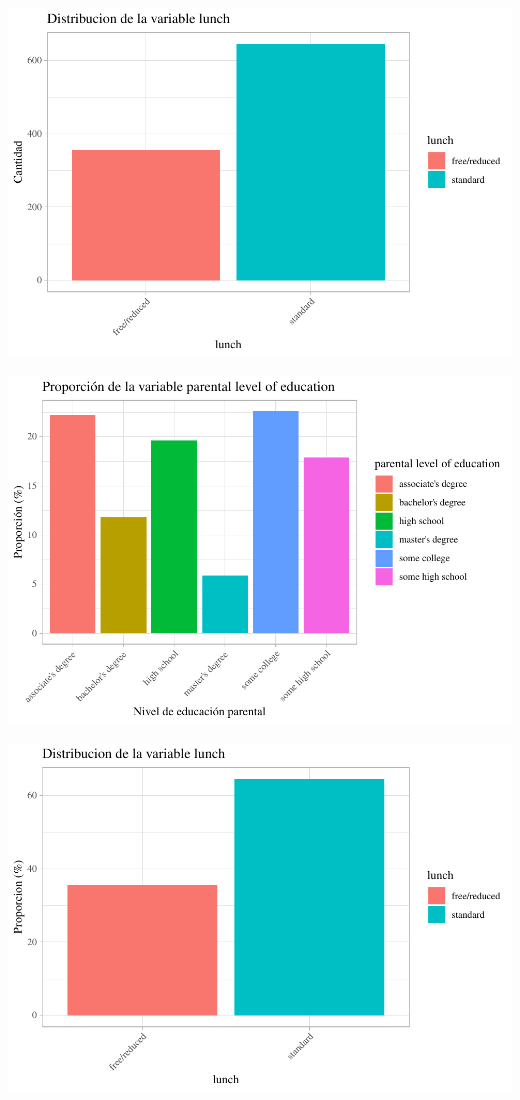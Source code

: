 \documentclass[
]{article}
\begin{document}
\begin{center}\includegraphics{Trabajo-Grupo-6.-Students-performance_files/figure-latex/unnamed-chunk-2-2} \end{center}

\begin{center}\includegraphics{Trabajo-Grupo-6.-Students-performance_files/figure-latex/unnamed-chunk-2-3} \end{center}

\begin{center}\includegraphics{Trabajo-Grupo-6.-Students-performance_files/figure-latex/unnamed-chunk-2-4} \end{center}
\end{document}
